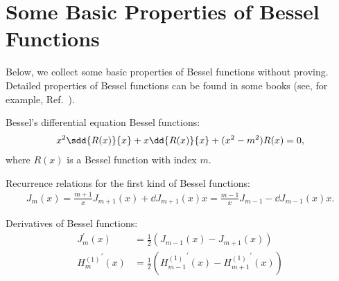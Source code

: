 \chapter{Some Basic Properties of Bessel Functions}
Below, we collect some basic properties of Bessel functions without proving. Detailed properties of Bessel functions can be found in some books (see, for example, Ref.~\cite{Watson1995}).

Bessel's differential equation Bessel functions:
\begin{align}
x^2\sdd{R(x)}{x}+x\dd{R(x)}{x}+(x^2-m^2)R(x)=0,
\end{align}
where $R(x)$ is a Bessel function with index $m$. 

Recurrence relations for the first kind of Bessel functions:
\begin{align}
J_m(x)=\frac{m+1}{x}J_{m+1}(x)+\dd{J_{m+1}(x)}{x}=\frac{m-1}{x}J_{m-1}-\dd{J_{m-1}(x)}{x}.
\end{align}

Derivatives of Bessel functions:
\begin{align}
J_m^\prime(x)&=\frac{1}{2}(J_{m-1}(x)-J_{m+1}(x))\\
{H^{(1)}_m}^\prime (x) &=\frac{1}{2}({H^{(1)}_{m-1}}^\prime (x)-{H^{(1)}_{m+1}}^\prime(x))
\end{align}